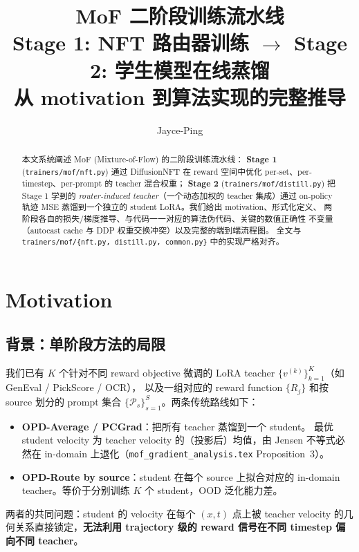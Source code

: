 \documentclass[11pt,a4paper]{article}
\title{\textbf{MoF 二阶段训练流水线}\\[0.3em]
\large Stage 1: NFT 路由器训练 \quad $\to$ \quad Stage 2: 学生模型在线蒸馏\\[0.4em]
\large 从 motivation 到算法实现的完整推导}
\author{Jayce-Ping}
\date{}
\theoremstyle{definition}
\begin{document}
\maketitle

\begin{abstract}
本文系统阐述 MoF (Mixture-of-Flow) 的二阶段训练流水线：
\textbf{Stage 1} (\texttt{trainers/mof/nft.py}) 通过 DiffusionNFT
在 reward 空间中优化 per-set、per-timestep、per-prompt 的 teacher 混合权重；
\textbf{Stage 2} (\texttt{trainers/mof/distill.py}) 把 Stage 1 学到的
\emph{router-induced teacher}（一个动态加权的 teacher 集成）通过 on-policy
轨迹 MSE 蒸馏到一个独立的 student LoRA。我们给出 motivation、形式化定义、
两阶段各自的损失/梯度推导、与代码一一对应的算法伪代码、关键的数值正确性
不变量（autocast cache 与 DDP 权重交换冲突）以及完整的端到端流程图。
全文与 \texttt{trainers/mof/\{nft.py, distill.py, common.py\}} 中的实现严格对齐。
\end{abstract}

\tableofcontents
\newpage

\section{Motivation}
\label{sec:motivation}

\subsection{背景：单阶段方法的局限}

我们已有 $K$ 个针对不同 reward objective 微调的 LoRA teacher
$\{v^{(k)}\}_{k=1}^K$（如 GenEval / PickScore / OCR），
以及一组对应的 reward function $\{R_j\}$ 和按 source 划分的 prompt 集合
$\{\mathcal{P}_s\}_{s=1}^S$。两条传统路线如下：

\begin{itemize}[leftmargin=1.5em]
\item \textbf{OPD-Average / PCGrad}：把所有 teacher 蒸馏到一个 student。
最优 student velocity 为 teacher velocity 的（投影后）均值，由 Jensen
不等式必然在 in-domain 上退化（\texttt{mof\_gradient\_analysis.tex}
Proposition~3）。
\item \textbf{OPD-Route by source}：student 在每个 source 上拟合对应的
in-domain teacher。等价于分别训练 $K$ 个 student，OOD 泛化能力差。
\end{itemize}

两者的共同问题：student 的 velocity 在每个 $(x, t)$ 点上被 teacher
velocity 的几何关系直接锁定，\textbf{无法利用 trajectory 级的 reward
信号在不同 timestep 偏向不同 teacher}。
\end{document}
